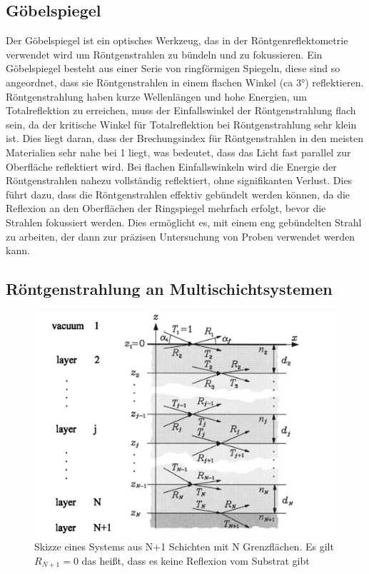 \subsection{Göbelspiegel}
Der Göbelspiegel ist ein optisches Werkzeug, das in der  Röntgenreflektometrie verwendet wird um Röntgenstrahlen 
zu bündeln und zu fokussieren. Ein Göbelspiegel besteht aus einer Serie von ringförmigen Spiegeln, diese sind so angeordnet,
dass sie Röntgenstrahlen in einem flachen Winkel (ca 3°) reflektieren. Röntgenstrahlung haben kurze Wellenlängen und hohe Energien,
um Totalreflektion zu erreichen, muss der Einfallswinkel der Röntgenstrahlung flach sein, da der kritische Winkel für Totalreflektion
bei Röntgenstrahlung sehr klein ist. Dies liegt daran, dass der Brechungsindex für Röntgenstrahlen in den meisten Materialien sehr
nahe bei 1 liegt, was bedeutet, dass das Licht fast parallel zur Oberfläche reflektiert wird. Bei flachen Einfallswinkeln wird die Energie
der Röntgenstrahlen nahezu vollständig reflektiert, ohne signifikanten Verlust. Dies führt dazu, dass die Röntgenstrahlen effektiv gebündelt 
werden können, da die Reflexion an den Oberflächen der Ringspiegel mehrfach erfolgt, bevor die Strahlen fokussiert werden. Dies ermöglicht es,
mit einem eng gebündelten Strahl zu arbeiten, der dann zur präzisen Untersuchung von Proben verwendet werden kann.

\subsection{Röntgenstrahlung an Multischichtsystemen}

\begin{figure}
    \includegraphics[width=\textwidth]{bilder/Multischichten.png}
    \caption{Skizze eines Systems aus N+1 Schichten mit N Grenzflächen. Es gilt $R_{N+1}=0$
    das heißt, dass es keine Reflexion vom Substrat gibt}
    \label{fig:Abbildung 3}
\end{figure}
\cite{Multischichten}

